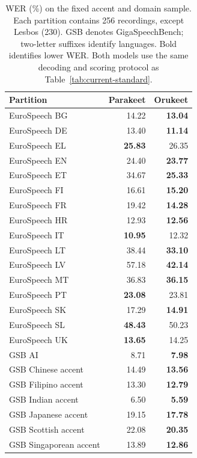 \begin{table}[!p]
\centering
\caption{WER (\%) on the fixed accent and domain sample. Each partition contains 256 recordings, except Lesbos (230). GSB denotes GigaSpeechBench; two-letter suffixes identify languages. Bold identifies lower WER. Both models use the same decoding and scoring protocol as Table~\ref{tab:current-standard}.}
\label{tab:current-domains}
\small
\begin{minipage}[t]{0.49\linewidth}
\vspace{0pt}
\centering
\setlength{\tabcolsep}{3pt}
\renewcommand{\arraystretch}{1.10}
\begin{tabular}{lrr}
\toprule
Partition & Parakeet & Orukeet\\
\midrule
EuroSpeech BG & 14.22 & \textbf{13.04}\\
EuroSpeech DE & 13.40 & \textbf{11.14}\\
EuroSpeech EL & \textbf{25.83} & 26.35\\
EuroSpeech EN & 24.40 & \textbf{23.77}\\
EuroSpeech ET & 34.67 & \textbf{25.33}\\
EuroSpeech FI & 16.61 & \textbf{15.20}\\
EuroSpeech FR & 19.42 & \textbf{14.28}\\
EuroSpeech HR & 12.93 & \textbf{12.56}\\
EuroSpeech IT & \textbf{10.95} & 12.32\\
EuroSpeech LT & 38.44 & \textbf{33.10}\\
EuroSpeech LV & 57.18 & \textbf{42.14}\\
EuroSpeech MT & 36.83 & \textbf{36.15}\\
EuroSpeech PT & \textbf{23.08} & 23.81\\
EuroSpeech SK & 17.29 & \textbf{14.91}\\
EuroSpeech SL & \textbf{48.43} & 50.23\\
EuroSpeech UK & \textbf{13.65} & 14.25\\
GSB AI & 8.71 & \textbf{7.98}\\
GSB Chinese accent & 14.49 & \textbf{13.56}\\
GSB Filipino accent & 13.30 & \textbf{12.79}\\
GSB Indian accent & 6.50 & \textbf{5.59}\\
GSB Japanese accent & 19.15 & \textbf{17.78}\\
GSB Scottish accent & 22.08 & \textbf{20.35}\\
GSB Singaporean accent & 13.89 & \textbf{12.86}\\

\end{tabular}
\end{minipage}
\end{table}
